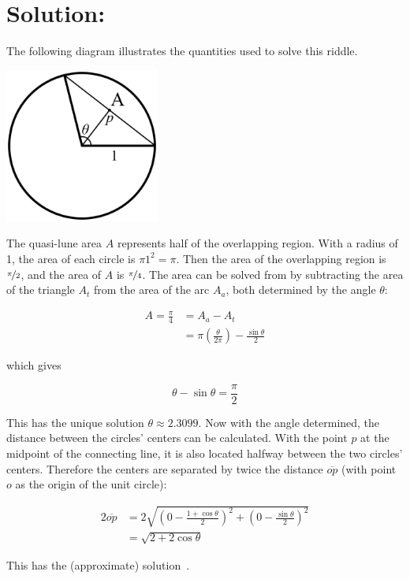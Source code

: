 \documentclass{article}
\begin{document}
\section*{Solution:}

The following diagram illustrates the quantities used to solve this riddle.

\begin{center}
\includegraphics[width=2in]{circle_diagram.png}
\end{center}

The quasi-lune area $A$ represents half of the overlapping region.
With a radius of 1, the area of each circle is $\pi1^{2}=\pi$.
Then the area of the overlapping region is $\nicefrac{\pi}{2}$, and the area of $A$ is $\nicefrac{\pi}{4}$.
The area can be solved from by subtracting the area of the triangle $A_{t}$ from the area of the arc $A_{a}$, both determined by the angle $\theta$:

\begin{align*}
A = \frac{\pi}{4}  &= A_{a}-A_{t} \\
                   &= \pi\left(\frac{\theta}{2\pi}\right)-\frac{\sin\theta}{2}
\end{align*}

which gives

\[
\theta-\sin\theta=\frac{\pi}{2}
\]

This has the unique solution $\theta\approx2.3099$.
Now with the angle determined, the distance between the circles' centers can be calculated.
With the point $p$ at the midpoint of the connecting line, it is also located halfway between the two circles' centers.
Therefore the centers are separated by twice the distance $\overline{op}$ (with point $o$ as the origin of the unit circle):

\begin{align*}
2\overline{op} &= 2\sqrt{\left(0-\frac{1+\cos\theta}{2}\right)^{2}+\left(0-\frac{\sin\theta}{2}\right)^{2}} \\
              &= \sqrt{2+2\cos\theta}
\end{align*}

This has the (approximate) solution
\,.
\end{document}
